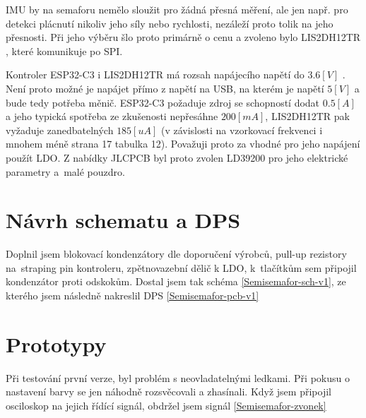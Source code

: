 IMU by na semaforu nemělo sloužit pro žádná přesná měření, ale jen např. pro detekci plácnutí nikoliv jeho síly nebo rychlosti, nezáleží proto tolik na jeho přesnosti.
Při jeho výběru šlo proto primárně o cenu a zvoleno bylo LIS2DH12TR \cite{LIS2DH12TR}, které komunikuje po SPI.

Kontroler ESP32-C3 i LIS2DH12TR má rozsah napájecího napětí do \(3.6 [V]\) \cite{ESP32C3}\cite{LIS2DH12TR}.
Není proto možné je napájet přímo z napětí na USB, na kterém je napětí \(5 [V]\) a bude tedy potřeba měnič.
ESP32-C3 požaduje zdroj se schopností dodat \(0.5 [A]\) \cite{ESP32C3} a jeho typická spotřeba ze zkušenosti nepřesáhne \(200 [mA]\), LIS2DH12TR pak vyžaduje zanedbatelných \(185 [uA]\) (v závislosti na vzorkovací frekvenci i mnohem méně \cite{LIS2DH12TR} strana 17 tabulka 12).
Považuji proto za vhodné pro jeho napájení použít LDO.
Z nabídky JLCPCB byl proto zvolen LD39200 \cite{LD39200} pro jeho elektrické parametry a~malé pouzdro.

\section{Návrh schematu a DPS}

Doplnil jsem blokovací kondenzátory dle doporučení výrobců, pull-up rezistory na~straping pin kontroleru, zpětnovazební dělič k LDO, k~tlačítkům sem připojil kondenzátor proti odskokům.
Dostal jsem tak schéma \ref{Semisemafor-sch-v1}, ze kterého jsem následně nakreslil DPS \ref{Semisemafor-pcb-v1}

\section{Prototypy}

Při testování první verze, byl problém s neovladatelnými ledkami.
Při pokusu o nastavení barvy se jen náhodně rozsvěcovali a zhasínali.
Když jsem připojil osciloskop na jejich řídící signál, obdržel jsem signál \ref{Semisemafor-zvonek} %

